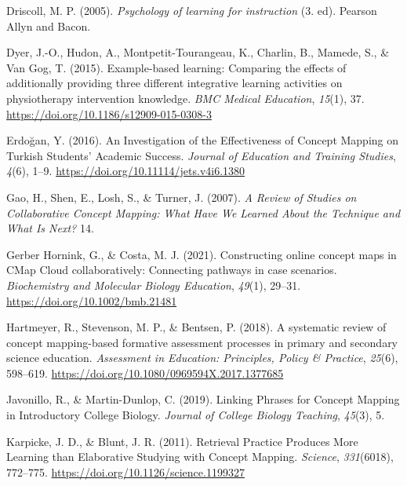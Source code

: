 \documentclass[
  letterpaper,
  DIV=11,
  numbers=noendperiod]{scrartcl}
\newlength{\cslhangindent}
\newlength{\cslentryspacingunit} %
\newenvironment{CSLReferences}[2] %
 {%
  \setlength{\parindent}{0pt}
  \ifodd #1
  \let\oldpar\par
  \def\par{\hangindent=\cslhangindent\oldpar}
  \fi
  \setlength{\parskip}{#2\cslentryspacingunit}
 }%
 {}
\begin{document}
\begin{CSLReferences}{1}{0}
\leavevmode{}%
Driscoll, M. P. (2005). \emph{Psychology of learning for instruction}
(3. ed). {Pearson Allyn and Bacon}.

\leavevmode{}%
Dyer, J.-O., Hudon, A., Montpetit-Tourangeau, K., Charlin, B., Mamede,
S., \& Van Gog, T. (2015). Example-based learning: Comparing the effects
of additionally providing three different integrative learning
activities on physiotherapy intervention knowledge. \emph{BMC Medical
Education}, \emph{15}(1), 37.
\url{https://doi.org/10.1186/s12909-015-0308-3}

\leavevmode{}%
Erdoğan, Y. (2016). An {Investigation} of the {Effectiveness} of
{Concept Mapping} on {Turkish Students}' {Academic Success}.
\emph{Journal of Education and Training Studies}, \emph{4}(6), 1--9.
\url{https://doi.org/10.11114/jets.v4i6.1380}

\leavevmode{}%
Gao, H., Shen, E., Losh, S., \& Turner, J. (2007). \emph{A {Review} of
{Studies} on {Collaborative Concept Mapping}: {What Have We Learned
About} the {Technique} and {What Is Next}?} 14.

\leavevmode{}%
Gerber Hornink, G., \& Costa, M. J. (2021). Constructing online concept
maps in {CMap Cloud} collaboratively: {Connecting} pathways in case
scenarios. \emph{Biochemistry and Molecular Biology Education},
\emph{49}(1), 29--31. \url{https://doi.org/10.1002/bmb.21481}

\leavevmode{}%
Hartmeyer, R., Stevenson, M. P., \& Bentsen, P. (2018). A systematic
review of concept mapping-based formative assessment processes in
primary and secondary science education. \emph{Assessment in Education:
Principles, Policy \& Practice}, \emph{25}(6), 598--619.
\url{https://doi.org/10.1080/0969594X.2017.1377685}

\leavevmode{}%
Javonillo, R., \& Martin-Dunlop, C. (2019). Linking {Phrases} for
{Concept Mapping} in {Introductory College Biology}. \emph{Journal of
College Biology Teaching}, \emph{45}(3), 5.

\leavevmode{}%
Karpicke, J. D., \& Blunt, J. R. (2011). Retrieval {Practice Produces
More Learning} than {Elaborative Studying} with {Concept Mapping}.
\emph{Science}, \emph{331}(6018), 772--775.
\url{https://doi.org/10.1126/science.1199327}


\end{CSLReferences}
\end{document}
